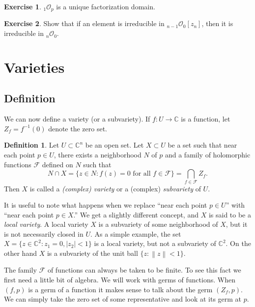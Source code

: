 \documentclass[12pt,openany]{book}
\newcommand{\abs}[1]{\left\lvert {#1} \right\rvert}
\newcommand{\norm}[1]{\left\lVert {#1} \right\rVert}
\newcommand{\C}{{\mathbb{C}}}
\newcommand{\sF}{{\mathcal{F}}}
\newcommand{\sO}{{\mathcal{O}}}
\newcommand{\myindex}[1]{#1\index{#1}}
\newcommand{\sectionnewpage}{}
\theoremstyle{plain}
\theoremstyle{remark}
\theoremstyle{definition}
\newtheorem{defn}[thm]{Definition}
\theoremstyle{exercise}
\newtheorem{exercise}{Exercise}[section]
\theoremstyle{example}
\begin{document}
\begin{exercise}
${}_1\sO_p$ is a unique factorization domain.
\end{exercise}

\begin{exercise}
Show that if an element is irreducible in 
${}_{n-1}\sO_0[z_n]$, then it is irreducible in
${}_{n}\sO_0$.
\end{exercise}


\sectionnewpage
\section{Varieties} \label{sec:varieties}

\subsection{Definition}

We can now define a variety (or a subvariety).  If $f \colon U \to \C$
is a function, let $Z_f = f^{-1}(0)$ denote the zero set.

\begin{defn}
Let $U \subset \C^n$ be an open set.  Let $X \subset U$ be a set such that
near each point $p \in U$, there exists a neighborhood $N$ of $p$
and a family of holomorphic functions $\sF$ defined on $N$ such that
\begin{equation}
N \cap X = \{ z \in N : f(z) = 0 \text{ for all } f \in \sF \} 
= \bigcap_{f \in \sF} Z_f .
\end{equation}
Then $X$ is called a
\emph{(complex) variety}
or a (complex) \emph{\myindex{subvariety}} of $U$.
\end{defn}

It is useful to note what happens when
we replace ``near each point $p \in U$'' with ``near each point $p \in
X$.''  We get a slightly different concept, and $X$ is said to be a
\emph{\myindex{local variety}}.  A local variety $X$ is a subvariety of
some neighborhood of $X$, but it is not necessarily closed in $U$.  As a
simple example, the set $X = \{ z \in \C^2 : z_1 = 0, \abs{z_2} < 1 \}$ is a
local variety, but not a subvariety of $\C^2$.  On the other hand $X$
is a subvariety of the unit ball $\{ z : \norm{z} < 1 \}$.

The family $\sF$ of functions can always be taken to be finite.  To see this
fact we first need a little bit of algebra.
We will work with germs of functions.  When $(f,p)$ is a germ of a function
it makes sense to talk about the germ $(Z_f,p)$.  We can simply take the zero
set of some representative and look at its germ at $p$.
\end{document}
